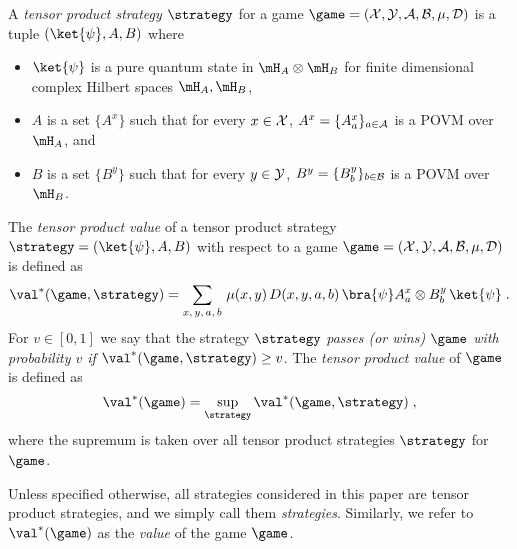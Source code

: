 \begin{definition}
\hypertarget{0009}{}
\reversemarginpar{}
  \label{def:tensor-product-strategy}
  A \emph{tensor product strategy} $\strategy$ for a game $\game = (\cal{X},
  \cal{Y}, \cal{A}, \cal{B}, \mu, D)$ is a tuple $(\ket{\psi}, A, B)$ where
  \begin{itemize}
	\item $\ket{\psi}$ is a pure quantum state in $\mH_A \otimes \mH_B$ for finite
    dimensional complex Hilbert spaces $\mH_A, \mH_B$,
	\item $A$ is a set $\{A^x\}$ such that for every $x \in \cal{X}$, $A^x =
    \{A^x_a \}_{a \in \cal{A}}$ is a POVM over $\mH_A$, and
	\item $B$ is a set $\{B^y\}$ such that for every $y \in \cal{Y}$, $B^y =
    \{B^y_b \}_{b \in \cal{B}}$ is a POVM over $\mH_B$.
\end{itemize}
\end{definition}

\begin{definition}
\hypertarget{000A}{}
\reversemarginpar{}
  \label{def:tensor-product-value}
	The \emph{tensor product value} of a tensor product strategy $\strategy =
  (\ket{\psi}, A, B)$  with respect to a game $\game=(\cal{X}, \cal{Y}, \cal{A},
  \cal{B}, \mu, D)$ is defined as
  \begin{equation*}
		\val^*(\game, \strategy) = \sum_{x,\, y,\, a,\, b} \, \mu(x,y)\, D(x,y,a,b)\,
    \bra{\psi} A^x_a \otimes B^y_b\, \ket{\psi}\;.
  \end{equation*}
	For $v\in[0,1]$ we say that the strategy $\strategy$ \emph{passes (or wins)
    $\game$ with probability $v$ if} $\val^*(\game, \strategy) \geq v$.
  The \emph{tensor product value} of $\game$ is defined as
  \begin{equation*}
		\val^*(\game) = \sup_\strategy \val^*(\game, \strategy)\;,
  \end{equation*}
	where the supremum is taken over all tensor product strategies $\strategy$ for
  $\game$.
\end{definition}


\begin{remark}
  Unless specified otherwise, all strategies considered in this paper are tensor
  product strategies, and we simply call them \emph{strategies}.
  Similarly, we refer to $\val^*(\game)$ as the \emph{value} of the game
  $\game$.
\end{remark}



